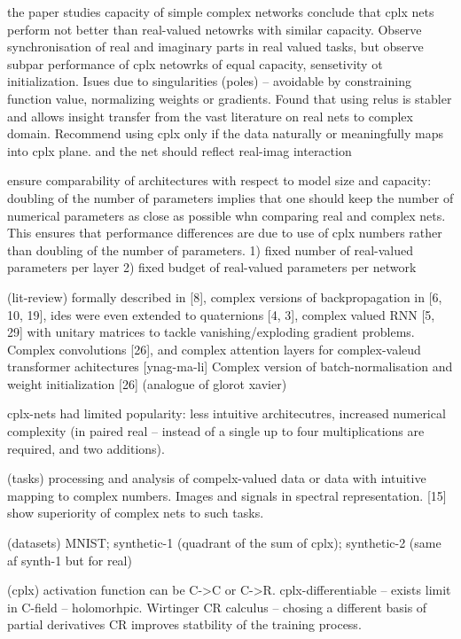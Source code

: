the paper studies capacity of simple complex networks
conclude that cplx nets perform not better than real-valued netowrks with similar capacity.
Observe synchronisation of real and imaginary parts in real valued tasks, but observe subpar
performance of cplx netowrks of equal capacity, sensetivity ot initialization. Isues due to 
singularities (poles) -- avoidable by constraining function value, normalizing weights or
gradients. Found that using relus is stabler and allows insight transfer from the vast literature
on real nets to complex domain. Recommend using cplx only if the data naturally or meaningfully
maps into cplx plane. and the net should reflect real-imag interaction


ensure comparability of architectures with respect to model size and capacity: doubling of
the number of parameters implies that one should keep the number of numerical parameters as
close as possible whn comparing real and complex nets. This ensures that performance differences
are due to use of cplx numbers rather than doubling of the number of parameters.
1) fixed number of real-valued parameters per layer
2) fixed budget of real-valued parameters per network


(lit-review) formally described in [8], complex versions of backpropagation in [6, 10, 19],
ides were even extended to quaternions [4, 3], complex valued RNN [5, 29] with unitary matrices
to tackle vanishing/exploding gradient problems. Complex convolutions [26], and complex attention
layers for complex-valeud transformer achitectures [ynag-ma-li]
Complex version of  batch-normalisation and weight initialization [26] (analogue of glorot xavier)

cplx-nets had limited popularity: less intuitive architecutres, increased numerical complexity (in
paired real -- instead of a single up to four multiplications are required, and two additions).


(tasks) processing and analysis of compelx-valued data or data with intuitive mapping to
complex numbers. Images and signals in spectral representation. [15] show superiority of complex
nets to such tasks.


(datasets) MNIST; synthetic-1 (quadrant of the sum of cplx); synthetic-2 (same af synth-1 but for real)


(cplx) activation function can be C->C or C->R. cplx-differentiable -- exists limit in
C-field -- holomorhpic. Wirtinger CR calculus -- chosing a different basis of partial derivatives
CR improves statbility of the training process.

